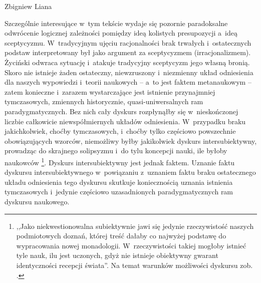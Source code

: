 \begin{artplenv}{Zbigniew Liana}


Szczególnie interesujące w~tym tekście wydaje się pozornie paradoksalne odwrócenie logicznej zależności pomiędzy ideą kolistych presupozycji a~ideą sceptycyzmu. W~tradycyjnym ujęciu racjonalności brak trwałych i~ostatecznych podstaw interpretowany był jako argument za sceptycyzmem (irracjonalizmem). Życiński odwraca sytuację i~atakuje tradycyjny sceptycyzm jego własną bronią. Skoro nie istnieje żaden ostateczny, niewzruszony i~niezmienny układ odniesienia dla naszych wypowiedzi i~teorii naukowych -- a~to jest faktem metanaukowym -- zatem konieczne i~zarazem wystarczające jest istnienie przynajmniej tymczasowych, zmiennych historycznie, quasi-uniwersalnych ram paradygmatycznych. Bez nich cały dyskurs rozpłynąłby się w~nieskończonej liczbie całkowicie niewspółmiernych układów odniesienia. W~przypadku braku jakichkolwiek, choćby tymczasowych, i~choćby tylko częściowo powszechnie obowiązujących wzorców, niemożliwy byłby jakikolwiek dyskurs intersubiektywny, prowadząc do skrajnego solipsyzmu i~do tylu koncepcji nauki, ile byłoby naukowców
\parencite[][s.~185]{zycinski_teizm_1985}%
\footnote{,,Jako niekwestionowalna subiektywnie jawi się jedynie rzeczywistość naszych podmiotowych doznań, której treść dałaby co najwyżej podstawę do wypracowania nowej monadologii. W~rzeczywistości takiej mogłoby istnieć tyle nauk, ilu jest uczonych, gdyż nie istnieje obiektywny gwarant identyczności recepcji świata''. Na temat warunków możliwości dyskursu zob. 
\parencite[][s.~194]{zycinski_teizm_1985}.%
}. Dyskurs intersubiektywny jest jednak faktem. Uznanie faktu dyskursu intersubiektywnego w~powiązaniu z~uznaniem faktu braku ostatecznego układu odniesienia tego dyskursu skutkuje koniecznością uznania istnienia tymczasowych i~jedynie częściowo uzasadnionych paradygmatycznych ram dyskursu naukowego.


\end{artplenv}
